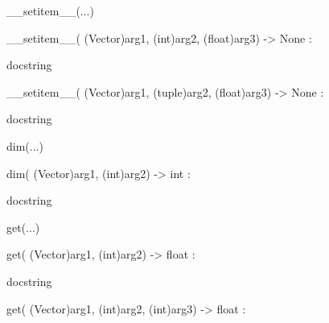 \documentclass[letterpaper,10pt,english]{sphinxmanual}
\begin{document}
\begin{description}
\begin{description}
\begin{DUlineblock}{0em}
\item[] 
\item[] \_\_setitem\_\_(...)
\item[]
\begin{DUlineblock}{\DUlineblockindent}
\item[] \_\_setitem\_\_( (Vector)arg1, (int)arg2, (float)arg3) -\textgreater{} None :
\item[]
\begin{DUlineblock}{\DUlineblockindent}
\item[] docstring
\item[] 
\end{DUlineblock}
\item[] \_\_setitem\_\_( (Vector)arg1, (tuple)arg2, (float)arg3) -\textgreater{} None :
\item[]
\begin{DUlineblock}{\DUlineblockindent}
\item[] docstring
\item[] 
\end{DUlineblock}
\end{DUlineblock}
\item[] dim(...)
\item[]
\begin{DUlineblock}{\DUlineblockindent}
\item[] dim( (Vector)arg1, (int)arg2) -\textgreater{} int :
\item[]
\begin{DUlineblock}{\DUlineblockindent}
\item[] docstring
\item[] 
\end{DUlineblock}
\end{DUlineblock}
\item[] get(...)
\item[]
\begin{DUlineblock}{\DUlineblockindent}
\item[] get( (Vector)arg1, (int)arg2) -\textgreater{} float :
\item[]
\begin{DUlineblock}{\DUlineblockindent}
\item[] docstring
\item[] 
\end{DUlineblock}
\item[] get( (Vector)arg1, (int)arg2, (int)arg3) -\textgreater{} float :
\item[]
\begin{DUlineblock}{\DUlineblockindent}

\end{DUlineblock}
\end{DUlineblock}
\end{DUlineblock}
\end{description}
\end{description}
\end{document}
